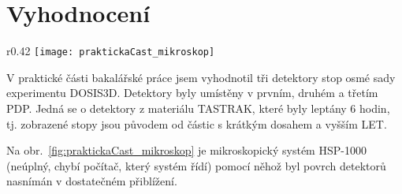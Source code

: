 \section{Vyhodnocení}
\begin{wrapfigure}{r}{0.42\textwidth}
  \centering
  \texttt{[image: praktickaCast\_mikroskop]}
  \caption{Vysoko rychlostní optický mikroskop HSP-1000.~\cite{dosis_HSP1000}}
  \label{fig:praktickaCast_mikroskop}
  \vspace{-10pt}
\end{wrapfigure}
V praktické části bakalářské práce jsem vyhodnotil tři detektory stop osmé sady experimentu DOSIS3D. Detektory byly umístěny v prvním, druhém a třetím PDP. Jedná se o detektory z materiálu TASTRAK, které byly leptány 6 hodin, tj. zobrazené stopy jsou původem od částic s krátkým dosahem a vyšším LET.

Na obr.~\ref{fig:praktickaCast_mikroskop} je mikroskopický systém HSP-1000 (neúplný, chybí počítač, který systém řídí) pomocí něhož byl povrch detektorů nasnímán v dostatečném přiblížení.

